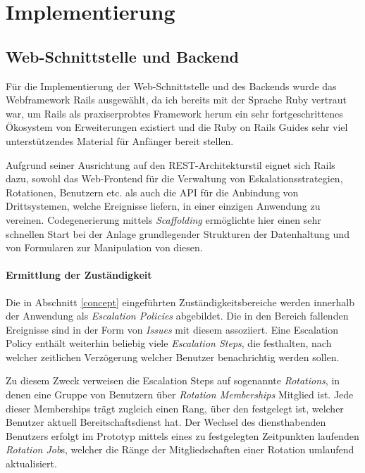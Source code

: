\documentclass[11pt,utf8,notoc,bibnum,german,final]{zihpub}
\begin{document}
\section{Implementierung}

\subsection{Web-Schnittstelle und Backend}

Für die Implementierung der Web-Schnittstelle und des Backends wurde das
Webframework Rails \cite{rails} ausgewählt, da ich bereits mit der Sprache
Ruby vertraut war, um Rails als praxiserprobtes Framework herum ein sehr
fortgeschrittenes Ökosystem von Erweiterungen existiert und die Ruby on Rails
Guides \cite{rails-guides} sehr viel unterstützendes Material für Anfänger
bereit stellen.

Aufgrund seiner Ausrichtung auf den REST-Architekturstil \cite{fielding-rest}
eignet sich Rails dazu, sowohl das Web-Frontend für die Verwaltung von
Eskalationsstrategien, Rotationen, Benutzern etc. als auch die API für die
Anbindung von Drittsystemen, welche Ereignisse liefern, in einer einzigen
Anwendung zu vereinen. Codegenerierung mittels \emph{Scaffolding} ermöglichte
hier einen sehr schnellen Start bei der Anlage grundlegender Strukturen der
Datenhaltung und von Formularen zur Manipulation von diesen.

\paragraph{Ermittlung der Zuständigkeit}

Die in Abschnitt \ref{concept} eingeführten Zuständigkeitsbereiche werden
innerhalb der Anwendung als \emph{Escalation Policies} abgebildet. Die in den
Bereich fallenden Ereignisse sind in der Form von \emph{Issues} mit diesem
assoziiert. Eine Escalation Policy enthält weiterhin beliebig viele
\emph{Escalation Steps}, die festhalten, nach welcher zeitlichen Verzögerung
welcher Benutzer benachrichtig werden sollen.

Zu diesem Zweck verweisen die Escalation Steps auf sogenannte \emph{Rotations},
in denen eine Gruppe von Benutzern über \emph{Rotation Memberships} Mitglied
ist. Jede dieser Memberships trägt zugleich einen Rang, über den festgelegt
ist, welcher Benutzer aktuell Bereitschaftsdienst hat. Der Wechsel des
diensthabenden Benutzers erfolgt im Prototyp mittels eines zu festgelegten
Zeitpunkten laufenden \emph{Rotation Job}s, welcher die Ränge der
Mitgliedschaften einer Rotation umlaufend aktualisiert.
\end{document}
